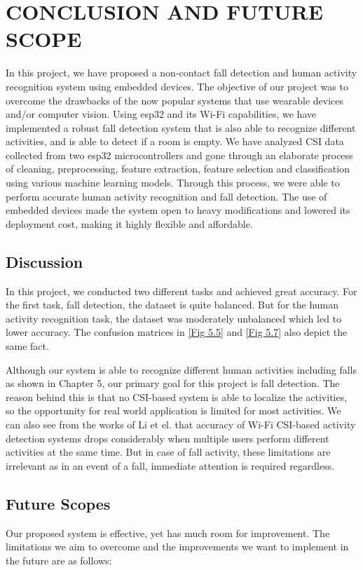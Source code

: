 \chapter{CONCLUSION AND FUTURE SCOPE}
 \label{Chapter 6}
\label{intro}

In this project, we have proposed a non-contact fall detection and human activity recognition system using embedded devices. The objective of our project was to overcome the drawbacks of the now popular systems that use wearable devices and/or computer vision. Using esp32 and its Wi-Fi capabilities, we have implemented a robust fall detection system that is also able to recognize different activities, and is able to detect if a room is empty. We have analyzed CSI data collected from two esp32 microcontrollers and gone through an elaborate process of cleaning, preprocessing, feature extraction, feature selection and classification using various machine learning models. Through this process, we were able to perform accurate human activity recognition and fall detection. The use of embedded devices made the system open to heavy modifications and lowered its deployment cost, making it highly flexible and affordable.

\section{Discussion}
In this project, we conducted two different tasks and achieved great accuracy. For the first task, fall detection, the dataset is quite balanced. But for the human activity recognition task, the dataset was moderately unbalanced which led to lower accuracy. The confusion matrices in \ref{Fig 5.5} and \ref{Fig 5.7} also depict the same fact.

Although our system is able to recognize different human activities including falls as shown in Chapter 5, our primary goal for this project is fall detection. The reason behind this is that no CSI-based system is able to localize the activities, so the opportunity for real world application is limited for most activities. We can also see from the works of Li et el.\cite{8873550} that accuracy of Wi-Fi CSI-based activity detection systems drops considerably when multiple users perform different activities at the same time. But in case of fall activity, these limitations are irrelevant as in an event of a fall, immediate attention is required regardless.


\section{Future Scopes}
Our proposed system is effective, yet has much room for improvement. The limitations we aim to overcome and the improvements we want to implement in the future are as follows:


